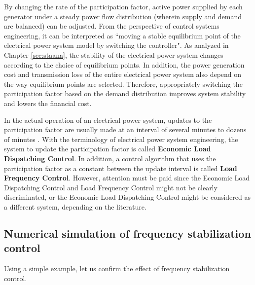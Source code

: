 \documentclass[graybox, envcountchap]{svmult}
\begin{document}
By changing the rate of the participation factor, active power supplied by each generator under a steady power flow distribution (wherein supply and demand are balanced) can be adjusted.
From the perspective of control systems engineering, it can be interpreted as “moving a stable equilibrium point of the electrical power system model by switching the controller".
As analyzed in Chapter \ref{sec:staana}, the stability of the electrical power system changes according to the choice of equilibrium points.
In addition, the power generation cost and transmission loss of the entire electrical power system also depend on the way equilibrium points are selected.
Therefore, appropriately switching the participation factor based on the demand distribution improves system stability and lowers the financial cost. 

In the actual operation of an electrical power system, updates to the participation factor are usually made at an interval of several minutes to dozens of minutes \cite[Section 11.1]{kundur1994power}.
With the terminology of electrical power system engineering, the system to update the participation factor is called \textbf{Economic Load Dispatching Control}.
In addition, a control algorithm that uses the participation factor as a constant between the update interval is called \textbf{Load Frequency Control}.
However, attention must be paid since the Economic Load Dispatching Control and Load Frequency Control might not be clearly discriminated, or the Economic Load Dispatching Control might be considered as a different system, depending on the literature. 


\subsection{Numerical simulation of frequency stabilization control}

Using a simple example, let us confirm the effect of frequency stabilization control.
\end{document}
